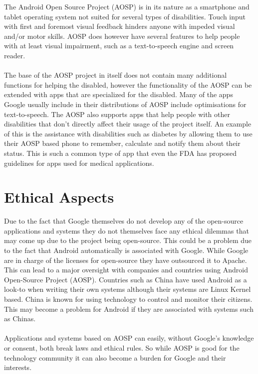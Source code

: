 \documentclass[conference]{IEEEtran}
\begin{document}
The Android Open Source Project (AOSP) is in its nature as a smartphone and tablet operating system not suited for several types of disabilities. Touch input with first and foremost visual feedback hinders anyone with impeded visual and/or motor skills. AOSP does however have several features to help people with at least visual impairment, such as a text-to-speech engine and screen reader.\cite{android-disabled-help} \\
\\
The base of the AOSP project in itself does not contain many additional functions for helping the disabled, however the functionality of the AOSP can be extended with apps that are specialized for the disabled.\cite{android-disabled-apps} Many of the apps Google usually include in their distributions of AOSP include optimisations for text-to-speech.\cite{android-disabled-help} The AOSP also supports apps that help people with other disabilities that don't directly affect their usage of the project itself. An example of this is the assistance with disabilities such as diabetes by allowing them to use their AOSP based phone to remember, calculate and notify them about their status.\cite{android-disabled-diabetes} This is such a common type of app that even the FDA has proposed guidelines for apps used for medical applications.\cite{android-disabled-FDA}



\section{Ethical Aspects}
\label{ethics}

Due to the fact that Google themselves do not develop any of the open-source applications and systems they do not themselves face any ethical dilemmas that may come up due to the project being open-source. This could be a problem due to the fact that Android automatically is associated with Google. While Google are in charge of the licenses for open-source they have outsourced it to Apache.\cite{android-licenses} This can lead to a major oversight with companies and countries using Android Open-Source Project (AOSP). Countries such as China have used Android as a look-to when writing their own systems\cite{country-license} although their systems are Linux Kernel based. China is known for using technology to control and monitor their citizens. This may become a problem for Android if they are associated with systems such as Chinas.\\
\\
Applications and systems based on AOSP can easily, without Google's knowledge or consent, both break laws and ethical rules. So while AOSP is good for the technology community it can also become a burden for Google and their interests.
\end{document}
